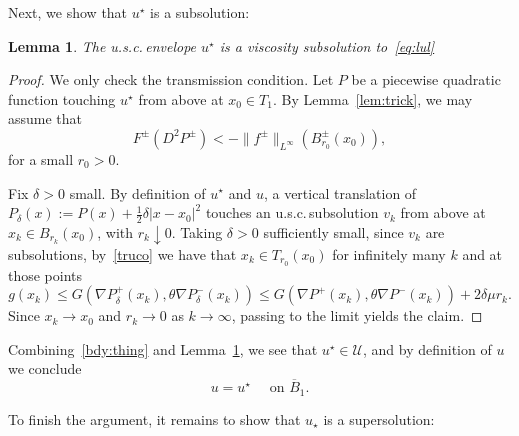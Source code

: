 \documentclass[letter,11pt]{amsart}
\newcommand{\usc}{u.s.c.\,}
\newcommand{\subsol}{\mathcal{U}}
\newtheorem{lem}[thm]{Lemma}
\theoremstyle{definition}
\numberwithin{equation}{section}
\begin{document}
\medskip

Next, we show that $u^{\star}$ is a subsolution:

\begin{lem}
\label{lem:sub}
The \usc envelope $u^{\star}$ is a viscosity subsolution to~\eqref{eq:lul}
\end{lem}
\begin{proof}
We only check the transmission condition.
Let $P$ be a piecewise quadratic function touching $u^{\star}$ from above at $x_0 \in T_1$.
By Lemma~\ref{lem:trick}, we may assume that
\begin{equation}
\label{truco}
F^{\pm}(D^2 P^{\pm}) < - \|f^{\pm}\|_{L^{\infty}}(B^{\pm}_{r_0}(x_0)),
\end{equation}
for a small $r_0 >0$.

\medskip

Fix $\delta >0$ small.
By definition of $u^{\star}$ and $u$, a vertical translation of $P_{\delta}(x) := P(x) + \frac{1}{2}\delta |x-x_0|^2$ touches an \usc subsolution $v_k$ from above at $x_k \in B_{r_k}(x_0)$, with $r_k \downarrow 0$.
Taking $\delta >0$ sufficiently small, since $v_k$ are subsolutions, by~\eqref{truco} we have that $x_k \in T_{r_0}(x_0)$ for infinitely many $k$ and at those points
\[
g(x_k) \leq G(\nabla P_{\delta}^{+}(x_k), \theta \nabla P_{\delta}^{-}(x_k))
\leq 
G(\nabla P^{+}(x_k), \theta \nabla P^{-}(x_k))
+ 2 \delta \mu r_k.
\]
Since $x_k \to x_0$ and $r_k \to 0$ as $k \to \infty$, passing to the limit yields the claim.
\end{proof}

\medskip

Combining~\eqref{bdy:thing} and Lemma~\ref{lem:sub}, we see that $u^{\star} \in \subsol$, and by definition of $u$ we conclude
\begin{equation}
\label{u:usc}
u = u^{\star} \quad \text{ on } \overline{B}_1.
\end{equation}

\medskip

To finish the argument, it remains to show that $u_{\star}$ is a supersolution:
\end{document}
